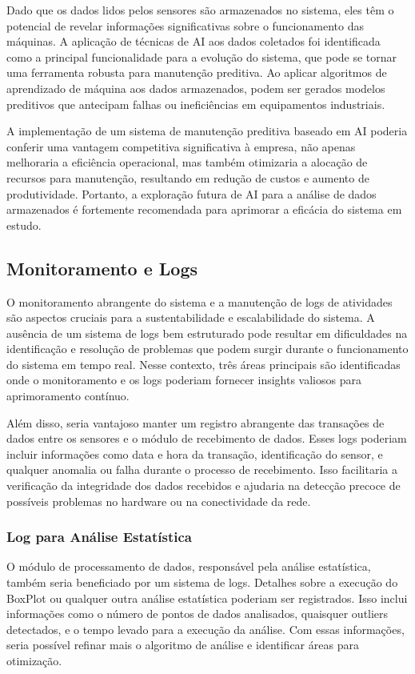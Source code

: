 Dado que os dados lidos pelos sensores são armazenados no sistema, eles têm o potencial de revelar informações significativas sobre o funcionamento das máquinas. A aplicação de técnicas de \gls{AI} aos dados coletados foi identificada como a principal funcionalidade para a evolução do sistema, que pode se tornar uma ferramenta robusta para manutenção preditiva. Ao aplicar algoritmos de aprendizado de máquina aos dados armazenados, podem ser gerados modelos preditivos que antecipam falhas ou ineficiências em equipamentos industriais.

A implementação de um sistema de manutenção preditiva baseado em \gls{AI} poderia conferir uma vantagem competitiva significativa à empresa, não apenas melhoraria a eficiência operacional, mas também otimizaria a alocação de recursos para manutenção, resultando em redução de custos e aumento de produtividade. Portanto, a exploração futura de \gls{AI} para a análise de dados armazenados é fortemente recomendada para aprimorar a eficácia do sistema em estudo.

\subsection{Monitoramento e Logs}

O monitoramento abrangente do sistema e a manutenção de logs de atividades são aspectos cruciais para a sustentabilidade e escalabilidade do sistema. A ausência de um sistema de logs bem estruturado pode resultar em dificuldades na identificação e resolução de problemas que podem surgir durante o funcionamento do sistema em tempo real. Nesse contexto, três áreas principais são identificadas onde o monitoramento e os logs poderiam fornecer insights valiosos para aprimoramento contínuo.

Além disso, seria vantajoso manter um registro abrangente das transações de dados entre os sensores e o módulo de recebimento de dados. Esses logs poderiam incluir informações como data e hora da transação, identificação do sensor, e qualquer anomalia ou falha durante o processo de recebimento. Isso facilitaria a verificação da integridade dos dados recebidos e ajudaria na detecção precoce de possíveis problemas no hardware ou na conectividade da rede.

\subsubsection{Log para Análise Estatística}

O módulo de processamento de dados, responsável pela análise estatística, também seria beneficiado por um sistema de logs. Detalhes sobre a execução do BoxPlot ou qualquer outra análise estatística poderiam ser registrados. Isso inclui informações como o número de pontos de dados analisados, quaisquer outliers detectados, e o tempo levado para a execução da análise. Com essas informações, seria possível refinar mais o algoritmo de análise e identificar áreas para otimização.

